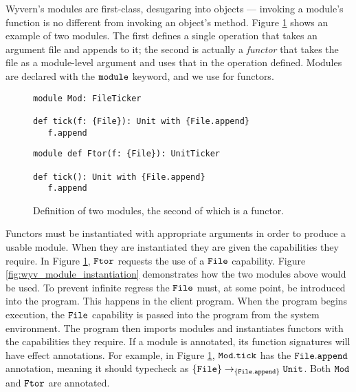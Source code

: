 Wyvern's modules are first-class, desugaring into objects --- invoking a module's function is no different from invoking an object's method.
Figure \ref{fig:wyv_modules} shows an example of two modules.
The first defines a single operation  that takes an argument file and appends to it; the second is actually a \textit{functor} that takes the file as a module-level argument and uses that in the operation defined.
Modules are declared with the $\mathtt{module}$ keyword, and we use   for functors.

\begin{figure}[h]

\begin{lstlisting}
module Mod: FileTicker

def tick(f: {File}): Unit with {File.append}
   f.append

\end{lstlisting}

\begin{lstlisting}
module def Ftor(f: {File}): UnitTicker

def tick(): Unit with {File.append}
   f.append
\end{lstlisting}

\caption{Definition of two modules, the second of which is a functor.}
\label{fig:wyv_modules}
\end{figure}

Functors must be instantiated with appropriate arguments in order to produce a usable module.
When they are instantiated they are given the capabilities they require.
In Figure \ref{fig:wyv_modules}, $\mathtt{Ftor}$ requests the use of a $\mathtt{File}$ capability.
Figure \ref{fig:wyv_module_instantiation} demonstrates how the two modules above would be used. To prevent infinite regress the $\mathtt{File}$ must, at some point, be introduced into the program. This happens in the client program. When the program begins execution, the $\mathtt{File}$ capability is passed into the program from the system environment. The program then imports modules and instantiates functors with the capabilities they require. If a module is annotated, its function signatures will have effect annotations. For example, in Figure \ref{fig:wyv_modules}, $\mathtt{Mod.tick}$ has the $\mathtt{File.append}$ annotation, meaning it should typecheck as $\mathtt{ \{ File \} \rightarrow_{\{\mathtt{File.append}\}} \mathtt{Unit} }$. Both $\mathtt{Mod}$ and $\mathtt{Ftor}$ are annotated. 


